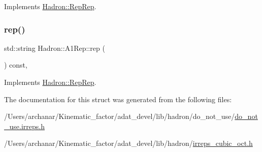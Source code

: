 Implements \mbox{\hyperlink{structHadron_1_1RepRep_ab3213025f6de249f7095892109575fde}{Hadron\+::\+Rep\+Rep}}.

\mbox{\label{structHadron_1_1A1Rep_a6b592d902063cfea9bd1cedcdeb9ac79}} 
\subsubsection{\texorpdfstring{rep()}{rep()}\hspace{0.1cm}{\footnotesize\ttfamily [3/3]}}
{\footnotesize\ttfamily std\+::string Hadron\+::\+A1\+Rep\+::rep (\begin{DoxyParamCaption}{ }\end{DoxyParamCaption}) const\hspace{0.3cm}{\ttfamily [inline]}, {\ttfamily [virtual]}}



Implements \mbox{\hyperlink{structHadron_1_1RepRep_ab3213025f6de249f7095892109575fde}{Hadron\+::\+Rep\+Rep}}.



The documentation for this struct was generated from the following files\+:\begin{DoxyCompactItemize}
\item 
/\+Users/archanar/\+Kinematic\+\_\+factor/adat\+\_\+devel/lib/hadron/do\+\_\+not\+\_\+use/\mbox{\hyperlink{do__not__use_8irreps_8h}{do\+\_\+not\+\_\+use.\+irreps.\+h}}\item 
/\+Users/archanar/\+Kinematic\+\_\+factor/adat\+\_\+devel/lib/hadron/\mbox{\hyperlink{lib_2hadron_2irreps__cubic__oct_8h}{irreps\+\_\+cubic\+\_\+oct.\+h}}\end{DoxyCompactItemize}
